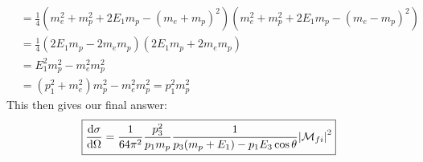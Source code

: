 \documentclass[12pt]{article}
\newcommand{\M}{\mathcal{M}}
\begin{document}
\begin{enumerate}[label=\alph*)]
\begin{align*}
    &=\frac14(m_e^2+m_p^2+2E_1m_p-(m_e+m_p)^2)(m_e^2+m_p^2+2E_1m_p-(m_e-m_p)^2)\\
    &=\frac14(2E_1m_p-2m_em_p)(2E_1m_p+2m_em_p)\\
    &=E_1^2m_p^2-m_e^2m_p^2\\
    &=(p_1^2+m_e^2)m_p^2-m_e^2m_p^2=p_1^2m_p^2
  \end{align*}
  This then gives our final answer:
  \begin{equation}
    \label{eq:p6b}
    \boxed{\dv{\sigma}{\Omega}=\frac{1}{64\pi^2}
      \frac{p_3^2}{p_1m_p}
      \frac{1}{p_3(m_p+E_1)-p_1E_3\cos\theta}\abs{\M_{fi}}^2}
  \end{equation}
\end{enumerate}
\end{document}
